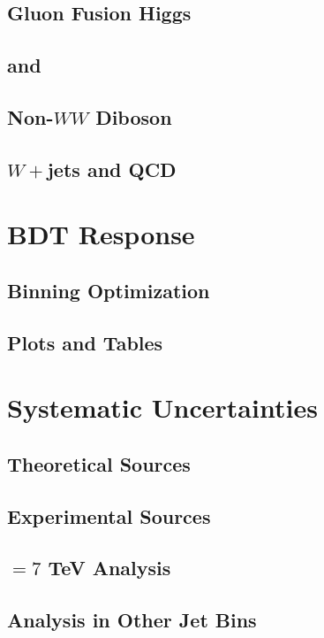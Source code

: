 %

\subsection{Gluon Fusion Higgs}

%

\subsection{\ZDYll and \Ztautau}

\subsection{Non-$WW$ Diboson}

\subsection{$W+$jets and QCD}

\section{BDT Response}

\subsection{Binning Optimization}

\subsection{Plots and Tables}

\section{Systematic Uncertainties}

\subsection{Theoretical Sources}

\subsection{Experimental Sources}

\subsection{\sqrts$=7$ TeV Analysis}

\subsection{\hwwlnln Analysis in Other Jet Bins}




